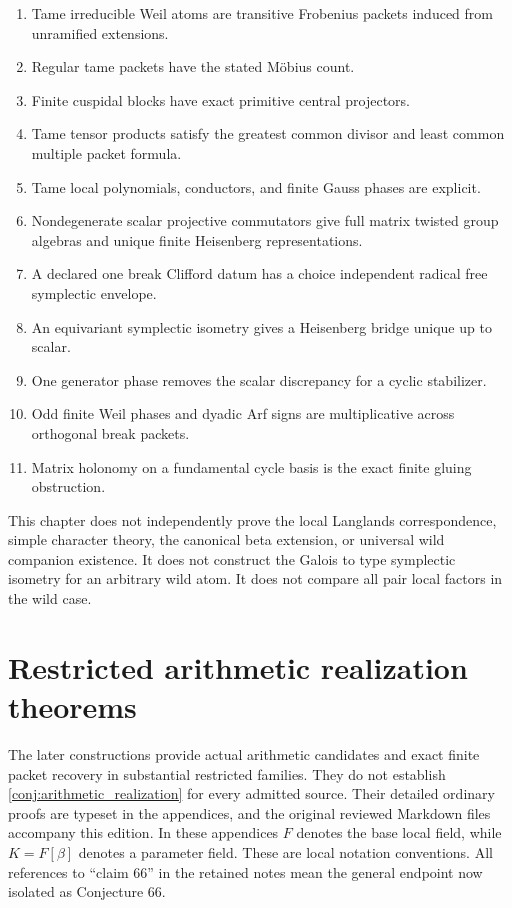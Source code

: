 \documentclass[11pt]{amsart}
\theoremstyle{definition}
\theoremstyle{remark}
\begin{document}
\begin{enumerate}
\item Tame irreducible Weil atoms are transitive Frobenius packets induced from unramified extensions.
\item Regular tame packets have the stated Möbius count.
\item Finite cuspidal blocks have exact primitive central projectors.
\item Tame tensor products satisfy the greatest common divisor and least common multiple packet formula.
\item Tame local polynomials, conductors, and finite Gauss phases are explicit.
\item Nondegenerate scalar projective commutators give full matrix twisted group algebras and unique finite Heisenberg representations.
\item A declared one break Clifford datum has a choice independent radical free symplectic envelope.
\item An equivariant symplectic isometry gives a Heisenberg bridge unique up to scalar.
\item One generator phase removes the scalar discrepancy for a cyclic stabilizer.
\item Odd finite Weil phases and dyadic Arf signs are multiplicative across orthogonal break packets.
\item Matrix holonomy on a fundamental cycle basis is the exact finite gluing obstruction.
\end{enumerate}

This chapter does not independently prove the local Langlands correspondence, simple character theory, the canonical beta extension, or universal wild companion existence. It does not construct the Galois to type symplectic isometry for an arbitrary wild atom. It does not compare all pair local factors in the wild case.

\section{Restricted arithmetic realization theorems}
\label{sec:arithmetic_progress}

The later constructions provide actual arithmetic candidates and exact
finite packet recovery in substantial restricted families. They do not
establish \cref{conj:arithmetic_realization} for every admitted source.
Their detailed ordinary proofs are typeset in the appendices, and the
original reviewed Markdown files accompany this edition. In these
appendices \(F\) denotes the base local field, while \(K=F[\beta]\)
denotes a parameter field. These are local notation conventions.
All references to ``claim 66'' in the retained notes mean the general
endpoint now isolated as Conjecture 66.
\end{document}
